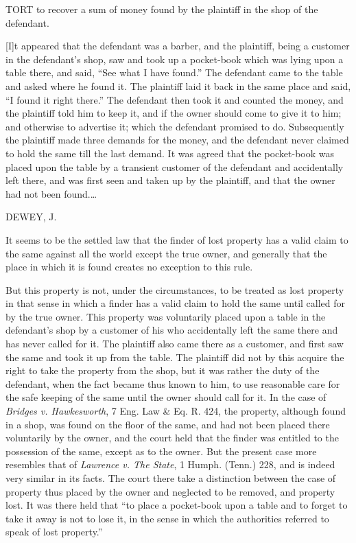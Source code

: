 
TORT to recover a sum of money found by the plaintiff in the shop of the
defendant.

[I]t appeared that the defendant was a barber, and the plaintiff, being a
customer in the defendant's shop, saw and took up a pocket-book which was lying
upon a table there, and said, ``See what I have found.'' The defendant came to
the table and asked where he found it. The plaintiff laid it back in the same
place and said, ``I found it right there.'' The defendant then took it and
counted the money, and the plaintiff told him to keep it, and if the owner
should come to give it to him; and otherwise to advertise it; which the
defendant promised to do. Subsequently the plaintiff made three demands for the
money, and the defendant never claimed to hold the same till the last demand.
It was agreed that the pocket-book was placed upon the table by a transient
customer of the defendant and accidentally left there, and was first seen and
taken up by the plaintiff, and that the owner had not been found.\ldots

DEWEY, J.

It seems to be the settled law that the finder of lost property has a valid
claim to the same against all the world except the true owner, and generally
that the place in which it is found creates no exception to this rule.

But this property is not, under the circumstances, to be treated as lost
property in that sense in which a finder has a valid claim to hold the same
until called for by the true owner. This property was voluntarily placed upon a
table in the defendant's shop by a customer of his who accidentally left the
same there and has never called for it. The plaintiff also came there as a
customer, and first saw the same and took it up from the table. The plaintiff
did not by this acquire the right to take the property from the shop, but it
was rather the duty of the defendant, when the fact became thus known to him,
to use reasonable care for the safe keeping of the same until the owner should
call for it. In the case of \textit{Bridges v. Hawkesworth}, 7 Eng. Law \& Eq.
R. 424, the property, although found in a shop, was found on the floor of the
same, and had not been placed there voluntarily by the owner, and the court
held that the finder was entitled to the possession of the same, except as to
the owner. But the present case more resembles that of \textit{Lawrence v. The
State}, 1 Humph. (Tenn.) 228, and is indeed very similar in its facts. The
court there take a distinction between the case of property thus placed by the
owner and neglected to be removed, and property lost. It was there held that
``to place a pocket-book upon a table and to forget to take it away is not to
lose it, in the sense in which the authorities referred to speak of lost
property.''

